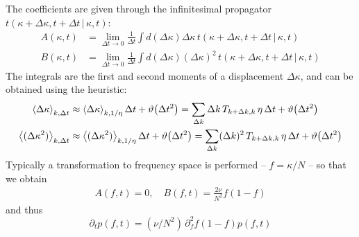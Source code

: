 \documentclass[pdftex,12pt,a4paper]{scrartcl}
\begin{document}
The coefficients are given through the infinitesimal propagator $t(\kappa + \Delta \kappa, t+\Delta t \, \vert \, \kappa, t)$:
\begin{equation}
    \begin{aligned}
        A(\kappa, t) &= \lim_{\Delta t \rightarrow 0} \frac{1}{\Delta t} \int \! d(\Delta \kappa) \Delta \kappa \, t(\kappa+\Delta \kappa, t+\Delta t \, \vert \, \kappa, t) \\
        B(\kappa, t) &= \lim_{\Delta t \rightarrow 0} \frac{1}{\Delta t} \int \! d(\Delta \kappa) (\Delta \kappa)^2 \, t(\kappa+\Delta \kappa, t+\Delta t \, \vert \, \kappa, t)
    \end{aligned}
\end{equation}
The integrals are the first and second moments of a displacement $\Delta \kappa$, and can be obtained using the heuristic:
\begin{equation}
    \begin{aligned}
    \ev{\Delta \kappa}_{k, \Delta t} &\approx \ev{\Delta \kappa}_{k, 1/\eta} \Delta t + \vartheta\qty(\Delta t^2) = \sum_{\Delta k} \Delta k \, T_{k+\Delta k,k} \, \eta \, \Delta t + \vartheta\qty(\Delta t^2) \\
    \ev{(\Delta \kappa^2)}_{k, \Delta t} &\approx \ev{(\Delta \kappa^2)}_{k, 1/\eta} \Delta t + \vartheta\qty(\Delta t^2) = \sum_{\Delta k} (\Delta k)^2 \, T_{k+\Delta k,k} \, \eta \, \Delta t + \vartheta\qty(\Delta t^2) 
    \end{aligned}
\end{equation}
Typically a transformation to frequency space is performed -- $ f = \kappa / N$ -- so that we obtain
\begin{align}
    A(f, t) = 0, \quad B(f, t) = \frac{2\nu}{N^2} f(1-f)
\end{align}
and thus
\begin{equation}\label{eq:FPMoran}
    \partial_t p(f,t) = (\nu / N^2) \, \partial_f^2 f(1-f) p(f,t) 
\end{equation}
\end{document}
